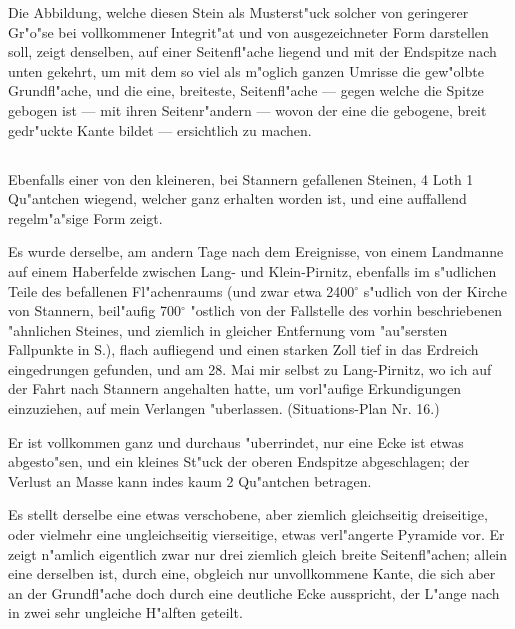 \documentclass[a4paper, 11pt, oneside, german]{article}
\begin{document}
Die Abbildung, welche diesen Stein als Musterst"uck solcher von geringerer Gr"o"se bei vollkommener Integrit"at und von ausgezeichneter Form darstellen soll, zeigt denselben, auf einer Seitenfl"ache liegend und mit der Endspitze nach unten gekehrt, um mit dem so viel als m"oglich ganzen Umrisse die gew"olbte Grundfl"ache, und die eine, breiteste, Seitenfl"ache --- gegen welche die Spitze gebogen ist --- mit ihren Seitenr"andern --- wovon der eine die gebogene, breit gedr"uckte Kante bildet --- ersichtlich zu machen.

\subsection{}
\paragraph{}
Ebenfalls einer von den kleineren, bei Stannern gefallenen Steinen, 4 Loth 1 Qu"antchen wiegend, welcher ganz erhalten worden ist, und eine auffallend regelm"a"sige Form zeigt.

Es wurde derselbe, am andern Tage nach dem Ereignisse, von einem Landmanne auf einem Haberfelde zwischen Lang- und Klein-Pirnitz, ebenfalls im s"udlichen Teile des befallenen Fl"achenraums (und zwar etwa 2400$^{\circ}$ s"udlich von der Kirche von Stannern, beil"aufig 700$^{\circ}$ "ostlich von der Fallstelle des vorhin beschriebenen "ahnlichen Steines, und ziemlich in gleicher Entfernung vom "au"sersten Fallpunkte in S.), flach aufliegend und einen starken Zoll tief in das Erdreich eingedrungen gefunden, und am 28. Mai mir selbst zu Lang-Pirnitz, wo ich auf der Fahrt nach Stannern angehalten hatte, um vorl"aufige Erkundigungen einzuziehen, auf mein Verlangen "uberlassen. (Situations-Plan Nr. 16.)

Er ist vollkommen ganz und durchaus "uberrindet, nur eine Ecke ist etwas abgesto"sen, und ein kleines St"uck der oberen Endspitze abgeschlagen; der Verlust an Masse kann indes kaum 2 Qu"antchen betragen.

Es stellt derselbe eine etwas verschobene, aber ziemlich gleichseitig dreiseitige, oder vielmehr eine ungleichseitig vierseitige, etwas verl"angerte Pyramide vor. Er zeigt n"amlich eigentlich zwar nur drei ziemlich gleich breite Seitenfl"achen; allein eine derselben ist, durch eine, obgleich nur unvollkommene Kante, die sich aber an der Grundfl"ache doch durch eine deutliche Ecke ausspricht, der L"ange nach in zwei sehr ungleiche H"alften geteilt.
\end{document}
